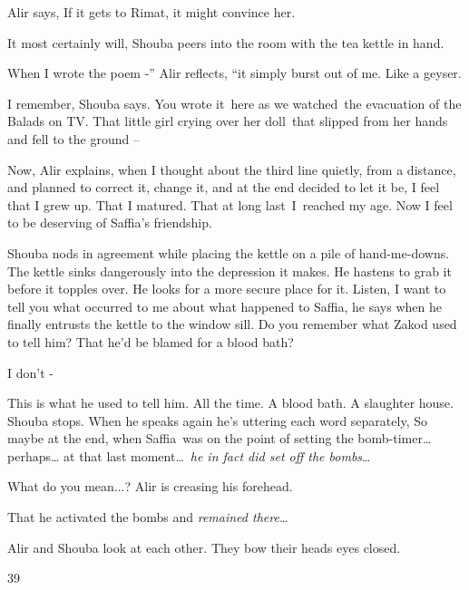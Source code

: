 \documentclass[letterpaper]{article}
\begin{document}
Alir says, {\textquotedbl}If it gets to Rimat, it might convince her.{\textquotedbl} 

{\textquotedbl}It most certainly will,{\textquotedbl} Shouba peers into the room with the tea kettle in hand. 

{\textquotedbl}When I wrote the poem -{}'' Alir reflects, ``it simply burst out of me. Like a geyser.{\textquotedbl} 

{\textquotedbl}I remember,{\textquotedbl} Shouba says. {\textquotedbl}You wrote it~here as we watched~the evacuation of
the Balads on TV. That little girl crying over her doll~that slipped from her hands and fell to the ground
--{\textquotedbl} 

{\textquotedbl}Now,{\textquotedbl} Alir explains, {\textquotedbl}when I thought about the third line quietly, from a
distance, and planned to correct it, change it, and at the end decided to let it be, I feel that I grew up. That I
matured. That at long last~I\ reached my age. Now I feel to be deserving of Saffia's friendship.{\textquotedbl} 

Shouba nods in agreement while placing the kettle on a pile of hand-me-downs. The kettle sinks dangerously into the
depression it makes. He hastens to grab it before it topples over. He looks for a more secure place for it.
{\textquotedbl}Listen, I want to tell you what occurred to me about what happened to Saffia,{\textquotedbl} he says
when he finally entrusts the kettle to the window sill. {\textquotedbl}Do you remember what Zakod used to tell him?
That he'd be blamed for a blood bath?{\textquotedbl} 

{\textquotedbl}I don't -{\textquotedbl} 

{\textquotedbl}This is what he used to tell him. All the time. A blood bath. A slaughter house.{\textquotedbl} Shouba
stops. When he speaks again he{}'s uttering each word separately, {\textquotedbl}So maybe at the end, when Saffia~was
on the point of setting the bomb-timer{\dots} perhaps{\dots} at that last moment{\dots}~\textit{he in fact did set off
the bombs}{\dots}{\textquotedbl} 

{\textquotedbl}What do you mean...?{\textquotedbl} Alir is creasing his forehead.

{\textquotedbl}That he activated the bombs and \textit{remained there}{\dots}{\textquotedbl}

Alir and Shouba look at each other. They bow their heads eyes closed. 


\bigskip

39~~~~~~~~~~~~~~~~~~~ 
\end{document}
